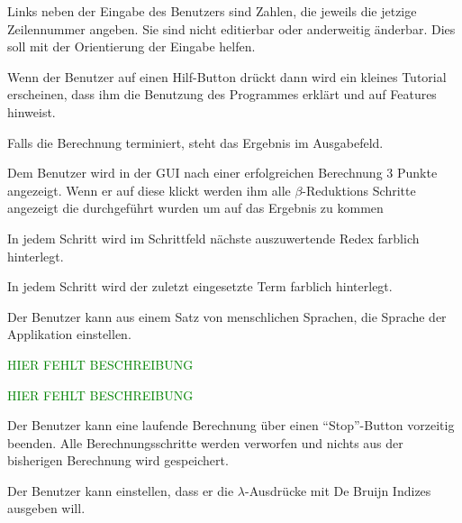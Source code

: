 \documentclass[parskip=full,11pt,twoside]{scrartcl}
\begin{document}
Links neben der Eingabe des Benutzers sind Zahlen, die jeweils die jetzige Zeilennummer angeben. Sie sind nicht editierbar oder anderweitig änderbar. Dies soll mit der Orientierung der Eingabe helfen.


Wenn der Benutzer auf einen Hilf-Button drückt dann wird ein kleines Tutorial erscheinen, dass ihm die Benutzung des Programmes erklärt und auf Features hinweist.

Falls die Berechnung terminiert, steht das Ergebnis im Ausgabefeld.

Dem Benutzer wird in der GUI nach einer erfolgreichen Berechnung 3 Punkte angezeigt. Wenn er auf diese klickt werden ihm alle $\beta$-Reduktions Schritte angezeigt die durchgeführt wurden um auf das Ergebnis zu kommen


In jedem Schritt wird im Schrittfeld nächste auszuwertende Redex farblich hinterlegt.

In jedem Schritt wird der zuletzt eingesetzte Term farblich hinterlegt.

Der Benutzer kann aus einem Satz von menschlichen Sprachen, die Sprache der Applikation einstellen.


\textcolor{green}{HIER FEHLT BESCHREIBUNG}

\textcolor{green}{HIER FEHLT BESCHREIBUNG}

 
Der Benutzer kann eine laufende Berechnung über einen \enquote{Stop}-Button vorzeitig beenden. Alle Berechnungsschritte werden verworfen und nichts aus der bisherigen Berechnung wird gespeichert.

Der Benutzer kann einstellen, dass er die $\lambda$-Ausdrücke mit De Bruijn Indizes ausgeben will.
\end{document}
